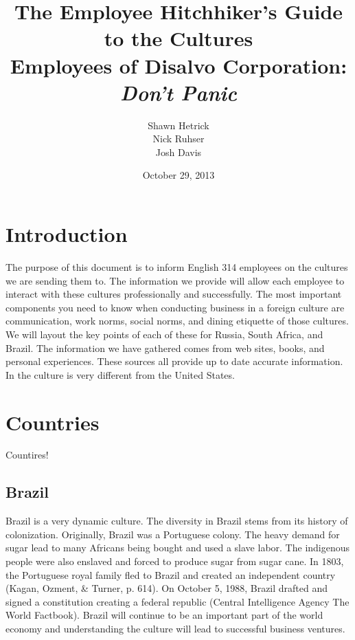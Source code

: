 \documentclass[11pt,a4paper,oneside]{report}
\title{
    \vspace{.1in}
    \textmd{\textbf{\Huge The Employee Hitchhiker's Guide to the Cultures}}\\
    \vspace{2in}
    \Large{Employees of Disalvo Corporation: \textit{Don't Panic}}
    \vspace{2in}
}
\author{
    Shawn Hetrick
    \\
    Nick Ruhser
    \\
    Josh Davis
    \vspace{1in}
}
\date{October 29, 2013}
\begin{document}
\thispagestyle{empty}
\renewcommand\headrulewidth{0pt}
\renewcommand\footrulewidth{0pt}

\maketitle

\newpage

\renewcommand\headrulewidth{0.4pt}
\renewcommand\footrulewidth{0.4pt}

\setcounter{secnumdepth}{0}
\setcounter{tocdepth}{3}


{\Large \tableofcontents}

\pagebreak

\doublespacing
{}

\section{Introduction}\label{first}

The purpose of this document is to inform English 314 employees on the cultures
we are sending them to.  The information we provide will allow each employee to
interact with these cultures professionally and successfully. The most
important components you need to know when conducting business in a foreign
culture are communication, work norms, social norms, and dining etiquette of
those cultures. We will layout the key points of each of these for Russia,
South Africa, and Brazil. The information we have gathered comes from web
sites, books, and personal experiences. These sources all provide up to date
accurate information. In the culture is very different from the United
States.

\section{Countries}\label{first}
Countires!

\subsection{Brazil}\label{second}

Brazil is a very dynamic culture. The diversity in Brazil stems from its
history of colonization. Originally, Brazil was a Portuguese colony.  The
heavy demand for sugar lead to many Africans being bought and used a slave
labor. The indigenous people were also enslaved and forced to produce sugar
from sugar cane. In 1803, the Portuguese royal family fled to Brazil and
created an independent country (Kagan, Ozment, \& Turner, p. 614). On
October 5, 1988, Brazil drafted and signed a constitution creating a
federal republic (Central Intelligence Agency The World Factbook). Brazil
will continue to be an important part of the world economy and
understanding the culture will lead to successful business ventures.
\end{document}
